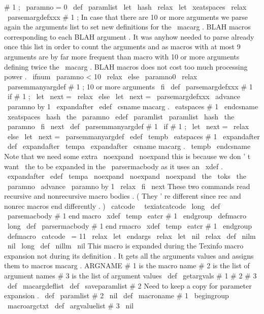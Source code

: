 {{{{#
1
;
{
%
\
paramno
=
0
\
def
\
paramlist
{
}
%
\
let
\
hash
\
relax
\
let
\
xeatspaces
\
relax
\
parsemargdefxxx
#
1
;
%
%
In
case
that
there
are
10
or
more
arguments
we
parse
again
the
arguments
%
list
to
set
new
definitions
for
the
\
macarg
.
BLAH
macros
corresponding
to
%
each
BLAH
argument
.
It
was
anyhow
needed
to
parse
already
once
this
list
%
in
order
to
count
the
arguments
and
as
macros
with
at
most
9
arguments
%
are
by
far
more
frequent
than
macro
with
10
or
more
arguments
defining
%
twice
the
\
macarg
.
BLAH
macros
does
not
cost
too
much
processing
power
.
\
ifnum
\
paramno
<
10
\
relax
\
else
\
paramno0
\
relax
\
parsemmanyargdef
#
1
;
%
10
or
more
arguments
\
fi
}
\
def
\
parsemargdefxxx
#
1
{
%
\
if
#
1
;
\
let
\
next
=
\
relax
\
else
\
let
\
next
=
\
parsemargdefxxx
\
advance
\
paramno
by
1
\
expandafter
\
edef
\
csname
macarg
.
\
eatspaces
{
#
1
}
\
endcsname
{
\
xeatspaces
{
\
hash
\
the
\
paramno
}
}
%
\
edef
\
paramlist
{
\
paramlist
\
hash
\
the
\
paramno
}
%
\
fi
\
next
}
\
def
\
parsemmanyargdef
#
1
{
%
\
if
#
1
;
\
let
\
next
=
\
relax
\
else
\
let
\
next
=
\
parsemmanyargdef
\
edef
\
tempb
{
\
eatspaces
{
#
1
}
}
%
\
expandafter
\
def
\
expandafter
\
tempa
\
expandafter
{
\
csname
macarg
.
\
tempb
\
endcsname
}
%
%
Note
that
we
need
some
extra
\
noexpand
\
noexpand
this
is
because
we
%
don
'
t
want
\
the
to
be
expanded
in
the
\
parsermacbody
as
it
uses
an
%
\
xdef
.
\
expandafter
\
edef
\
tempa
{
\
noexpand
\
noexpand
\
noexpand
\
the
\
toks
\
the
\
paramno
}
%
\
advance
\
paramno
by
1
\
relax
\
fi
\
next
}
%
These
two
commands
read
recursive
and
nonrecursive
macro
bodies
.
%
(
They
'
re
different
since
rec
and
nonrec
macros
end
differently
.
)
%
\
catcode
\
\
texiatcatcode
\
long
\
def
\
parsemacbody
#
1
end
macro
%
{
\
xdef
\
temp
{
\
eatcr
{
#
1
}
}
\
endgroup
\
defmacro
}
%
\
long
\
def
\
parsermacbody
#
1
end
rmacro
%
{
\
xdef
\
temp
{
\
eatcr
{
#
1
}
}
\
endgroup
\
defmacro
}
%
\
catcode
\
=
11
\
relax
\
let
\
endargs
\
relax
\
let
\
nil
\
relax
\
def
\
nilm
{
\
nil
}
%
\
long
\
def
\
nillm
{
\
nil
}
%
%
This
macro
is
expanded
during
the
Texinfo
macro
expansion
not
during
its
%
definition
.
It
gets
all
the
arguments
values
and
assigns
them
to
macros
%
macarg
.
ARGNAME
%
%
#
1
is
the
macro
name
%
#
2
is
the
list
of
argument
names
%
#
3
is
the
list
of
argument
values
\
def
\
getargvals
#
1
#
2
#
3
{
%
\
def
\
macargdeflist
{
}
%
\
def
\
saveparamlist
{
#
2
}
%
Need
to
keep
a
copy
for
parameter
expansion
.
\
def
\
paramlist
{
#
2
\
nil
}
%
\
def
\
macroname
{
#
1
}
%
\
begingroup
\
macroargctxt
\
def
\
argvaluelist
{
#
3
\
nil
}}}}}}
